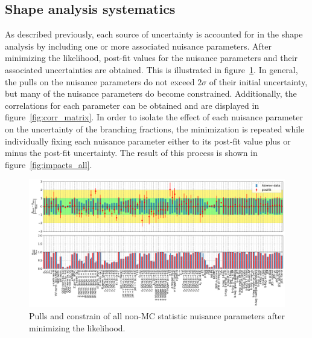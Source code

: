 \subsection{Shape analysis systematics}

As described previously, each source of uncertainty is accounted for in
the shape analysis by including one or more associated nuisance
parameters.  After minimizing the likelihood, post-fit values for the
nuisance parameters and their associated uncertainties are obtained.
This is illustrated in figure~\ref{fig:pulls_all}.  In general, the
pulls on the nuisance parameters do not exceed $2\sigma$ of their
initial uncertainty, but many of the nuisance parameters do become
constrained.  Additionally, the correlations for each parameter can be
obtained and are displayed in figure~\ref{fig:corr_matrix}.  In order to
isolate the effect of each nuisance parameter on the uncertainty of the 
branching fractions, the minimization is repeated while individually fixing each
nuisance parameter either to its post-fit value plus or minus the
post-fit uncertainty.  The result of this process is shown in
figure~\ref{fig:impacts_all}.

\begin{figure}[ht]
    \centering
    \includegraphics[width=1.2\textwidth, angle=-90]{chapters/Analysis/sectionSystematics/figures/asimov_pulls_summary.pdf}
    \caption{Pulls and constrain of all non-MC statistic nuisance
        parameters after minimizing the likelihood.}
    \label{fig:pulls_all}
\end{figure}

